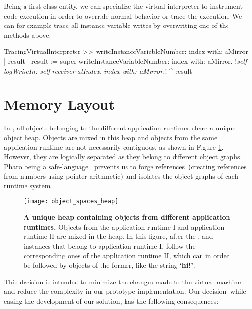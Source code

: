 Being a first-class entity, we can specialize the virtual interpreter to instrument code execution in order to override normal behavior or trace the execution. We can for example trace all instance variable writes by overwriting one of the methods above.

\begin{code}
TracingVirtualInterpreter >> writeInstanceVariableNumber: index with: aMirror
    | result |
    result := super writeInstanceVariableNumber: index with: aMirror.
    !\emph{self logWriteIn: self receiver atIndex: index with: aMirror.}!
    ^ result
\end{code}

\section{\Vtt Memory Layout} \label{sec:memory}

In \Vtt, all objects belonging to the different application runtimes share a unique object heap. Objects are mixed in this heap and objects from the same application runtime are not necessarily contiguous, as shown in Figure \ref{fig:heap}. However, they are logically separated as they belong to different object graphs. Pharo being a safe-language~\cite{Hawb98a,Hawb02a} prevents us to forge references~(\ie creating references from numbers using pointer arithmetic) and isolates the object graphs of each runtime system.

\begin{figure}[ht]
\begin{center}
\texttt{[image: object\_spaces\_heap]}
\caption{\textbf{A unique heap containing objects from different application runtimes.} Objects from the application runtime I and application runtime II are mixed in the heap. In this figure, after the ,  and  instances that belong to application runtime I, follow the corresponding ones of the application runtime II, which can in order be followed by objects of the former, like the string \textbf{`hi!'}. \label{fig:heap}}
\end{center}
\end{figure}

This decision is intended to minimize the changes made to the virtual machine and reduce the complexity in our prototype implementation. Our decision, while easing the development of our solution, has the following consequences:

